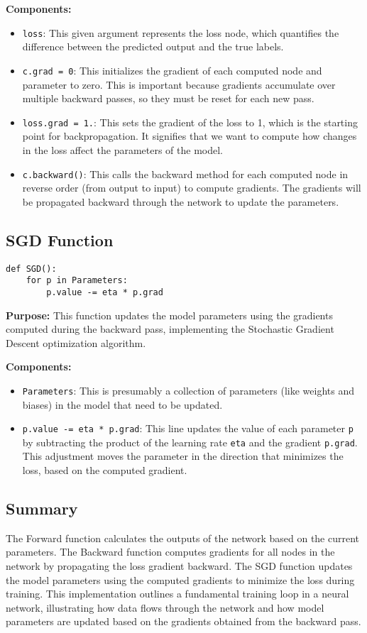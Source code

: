 \documentclass{article}
\begin{document}
\textbf{Components:}
\begin{itemize}
    \item \texttt{loss}: This given argument represents the loss node, which quantifies the difference between the predicted output and the true labels.
    \item \texttt{c.grad = 0}: This initializes the gradient of each computed node and parameter to zero. This is important because gradients accumulate over multiple backward passes, so they must be reset for each new pass.
    \item \texttt{loss.grad = 1.}: This sets the gradient of the loss to 1, which is the starting point for backpropagation. It signifies that we want to compute how changes in the loss affect the parameters of the model.
    \item \texttt{c.backward()}: This calls the backward method for each computed node in reverse order (from output to input) to compute gradients. The gradients will be propagated backward through the network to update the parameters.
\end{itemize}

\subsection{SGD Function}
\begin{verbatim}
def SGD():
    for p in Parameters:
        p.value -= eta * p.grad
\end{verbatim}

\textbf{Purpose:} This function updates the model parameters using the gradients computed during the backward pass, implementing the Stochastic Gradient Descent optimization algorithm. 

\textbf{Components:}
\begin{itemize}
    \item \texttt{Parameters}: This is presumably a collection of parameters (like weights and biases) in the model that need to be updated.
    \item \texttt{p.value -= eta * p.grad}: This line updates the value of each parameter \texttt{p} by subtracting the product of the learning rate \texttt{eta} and the gradient \texttt{p.grad}. This adjustment moves the parameter in the direction that minimizes the loss, based on the computed gradient.
\end{itemize}

\subsection{Summary}
The Forward function calculates the outputs of the network based on the current parameters. The Backward function computes gradients for all nodes in the network by propagating the loss gradient backward. The SGD function updates the model parameters using the computed gradients to minimize the loss during training. This implementation outlines a fundamental training loop in a neural network, illustrating how data flows through the network and how model parameters are updated based on the gradients obtained from the backward pass. 
\end{document}
